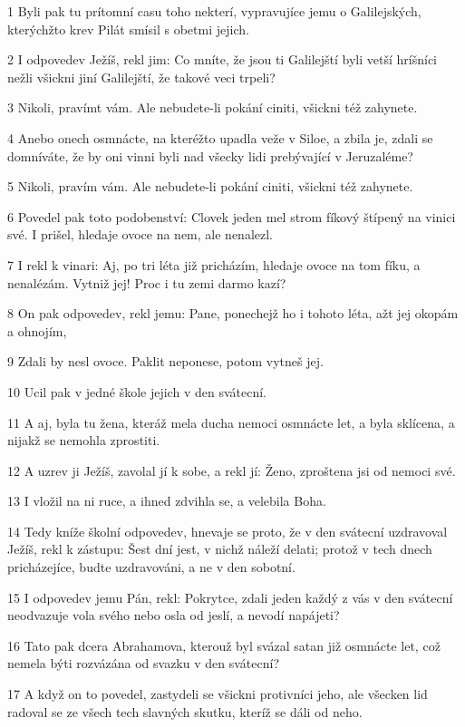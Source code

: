 \par 1 Byli pak tu prítomní casu toho nekterí, vypravujíce jemu o Galilejských, kterýchžto krev Pilát smísil s obetmi jejich.
\par 2 I odpovedev Ježíš, rekl jim: Co mníte, že jsou ti Galilejští byli vetší hríšníci nežli všickni jiní Galilejští, že takové veci trpeli?
\par 3 Nikoli, pravímt vám. Ale nebudete-li pokání ciniti, všickni též zahynete.
\par 4 Anebo onech osmnácte, na kteréžto upadla veže v Siloe, a zbila je, zdali se domníváte, že by oni vinni byli nad všecky lidi prebývající v Jeruzaléme?
\par 5 Nikoli, pravím vám. Ale nebudete-li pokání ciniti, všickni též zahynete.
\par 6 Povedel pak toto podobenství: Clovek jeden mel strom fíkový štípený na vinici své. I prišel, hledaje ovoce na nem, ale nenalezl.
\par 7 I rekl k vinari: Aj, po tri léta již pricházím, hledaje ovoce na tom fíku, a nenalézám. Vytniž jej! Proc i tu zemi darmo kazí?
\par 8 On pak odpovedev, rekl jemu: Pane, ponechejž ho i tohoto léta, ažt jej okopám a ohnojím,
\par 9 Zdali by nesl ovoce. Paklit neponese, potom vytneš jej.
\par 10 Ucil pak v jedné škole jejich v den svátecní.
\par 11 A aj, byla tu žena, kteráž mela ducha nemoci osmnácte let, a byla sklícena, a nijakž se nemohla zprostiti.
\par 12 A uzrev ji Ježíš, zavolal jí k sobe, a rekl jí: Ženo, zproštena jsi od nemoci své.
\par 13 I vložil na ni ruce, a ihned zdvihla se, a velebila Boha.
\par 14 Tedy kníže školní odpovedev, hnevaje se proto, že v den svátecní uzdravoval Ježíš, rekl k zástupu: Šest dní jest, v nichž náleží delati; protož v tech dnech pricházejíce, budte uzdravováni, a ne v den sobotní.
\par 15 I odpovedev jemu Pán, rekl: Pokrytce, zdali jeden každý z vás v den svátecní neodvazuje vola svého nebo osla od jeslí, a nevodí napájeti?
\par 16 Tato pak dcera Abrahamova, kterouž byl svázal satan již osmnácte let, což nemela býti rozvázána od svazku v den svátecní?
\par 17 A když on to povedel, zastydeli se všickni protivníci jeho, ale všecken lid radoval se ze všech tech slavných skutku, kteríž se dáli od neho.
